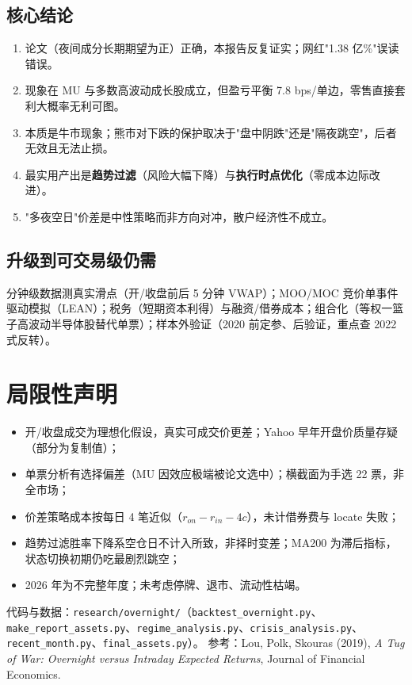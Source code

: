 \documentclass[11pt,a4paper,fontset=none]{ctexart}
\begin{document}
\subsection{核心结论}
\begin{enumerate}\itemsep2pt
  \item 论文（夜间成分长期期望为正）正确，本报告反复证实；网红"1.38 亿\%"误读错误。
  \item 现象在 MU 与多数高波动成长股成立，但盈亏平衡 7.8 bps/单边，零售直接套利大概率无利可图。
  \item 本质是牛市现象；熊市对下跌的保护取决于"盘中阴跌"还是"隔夜跳空"，后者无效且无法止损。
  \item 最实用产出是\textbf{趋势过滤}（风险大幅下降）与\textbf{执行时点优化}（零成本边际改进）。
  \item "多夜空日"价差是中性策略而非方向对冲，散户经济性不成立。
\end{enumerate}

\subsection{升级到可交易级仍需}
分钟级数据测真实滑点（开/收盘前后 5 分钟 VWAP）；MOO/MOC 竞价单事件驱动模拟（LEAN）；税务（短期资本利得）与融资/借券成本；组合化（等权一篮子高波动半导体股替代单票）；样本外验证（2020 前定参、后验证，重点查 2022 式反转）。

\appendix
\section{局限性声明}
\begin{itemize}\itemsep0pt
  \item 开/收盘成交为理想化假设，真实可成交价更差；Yahoo 早年开盘价质量存疑（部分为复制值）；
  \item 单票分析有选择偏差（MU 因效应极端被论文选中）；横截面为手选 22 票，非全市场；
  \item 价差策略成本按每日 4 笔近似（$r_{on}-r_{in}-4c$），未计借券费与 locate 失败；
  \item 趋势过滤胜率下降系空仓日不计入所致，非择时变差；MA200 为滞后指标，状态切换初期仍吃最剧烈跳空；
  \item 2026 年为不完整年度；未考虑停牌、退市、流动性枯竭。
\end{itemize}

\vspace{0.8em}
\noindent\small 代码与数据：\texttt{research/overnight/}（\texttt{backtest\_overnight.py}、\texttt{make\_report\_assets.py}、\texttt{regime\_analysis.py}、\texttt{crisis\_analysis.py}、\texttt{recent\_month.py}、\texttt{final\_assets.py}）。
参考：Lou, Polk, Skouras (2019), \textit{A Tug of War: Overnight versus Intraday Expected Returns}, Journal of Financial Economics.
\end{document}
